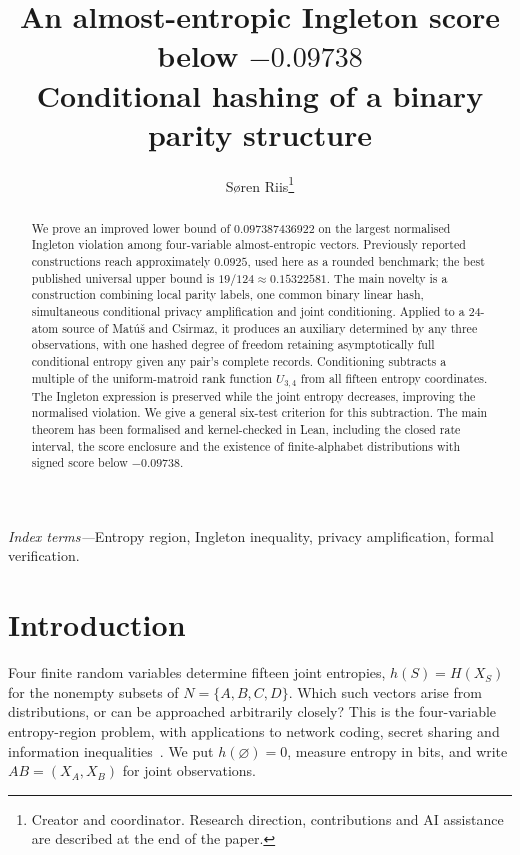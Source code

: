 \documentclass[a4paper,11pt]{article}
\title{An almost-entropic Ingleton score below $-0.09738$\\[3pt]
\large Conditional hashing of a binary parity structure}
\author{S\o ren Riis\thanks{Creator and coordinator. Research direction, contributions and AI assistance are described at the end of the paper.}}
\date{}
\begin{document}
\setlength{\abovedisplayskip}{8pt}
\setlength{\belowdisplayskip}{8pt}
\maketitle
\vspace{-1em}
\begin{abstract}
We prove an improved lower bound of $0.097387436922$ on the largest
normalised Ingleton violation among four-variable almost-entropic vectors.
Previously reported constructions reach approximately $0.0925$, used here
as a rounded benchmark; the best published universal upper bound is
$19/124\approx0.15322581$. The main novelty is a construction combining
local parity labels, one common binary linear hash, simultaneous conditional
privacy amplification and joint conditioning. Applied to a 24-atom source
of Mat\'u\v{s} and Csirmaz, it produces an auxiliary determined by any three
observations, with one hashed degree of freedom retaining asymptotically
full conditional entropy given any pair's complete records. Conditioning
subtracts a multiple of the uniform-matroid rank function $U_{3,4}$ from
all fifteen entropy coordinates. The Ingleton expression is preserved
while the joint entropy decreases, improving the normalised violation.
We give a general six-test criterion for this subtraction. The main
theorem has been formalised and kernel-checked in Lean, including the
closed rate interval, the score enclosure and the existence of finite-alphabet
distributions with signed score below $-0.09738$.
\end{abstract}
\noindent\textit{Index terms---}Entropy region, Ingleton inequality, privacy amplification, formal verification.

\section{Introduction}
Four finite random variables determine fifteen joint entropies,
$h(S)=H(X_S)$ for the nonempty subsets of $N=\{A,B,C,D\}$.
Which such vectors arise from distributions, or can be approached
arbitrarily closely? This is the four-variable entropy-region problem,
with applications to network coding, secret sharing and information
inequalities~\cite{DFZ,MC}. We put $h(\varnothing)=0$, measure entropy
in bits, and write $AB=(X_A,X_B)$ for joint observations.
\end{document}
